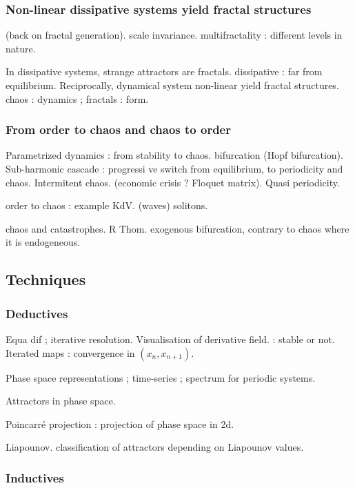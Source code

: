 \subsubsection{Non-linear dissipative systems yield fractal structures}

(back on fractal generation). scale invariance. multifractality : different levels in nature.

In dissipative systems, strange attractors are fractals. dissipative : far from equilibrium. Reciprocally, dynamical system non-linear yield fractal structures. chaos : dynamics ; fractals : form.

\subsubsection{From order to chaos and chaos to order}

Parametrized dynamics : from stability to chaos. bifurcation (Hopf bifurcation). Sub-harmonic cascade : progressi ve switch from equilibrium, to periodicity and chaos. Intermitent chaos. (economic crisis ? Floquet matrix). Quasi periodicity.

order to chaos : example KdV. (waves) solitons.

chaos and catastrophes. R Thom. exogenous bifurcation, contrary to chaos where it is endogeneous.

\subsection{Techniques}

\subsubsection{Deductives}

Equa dif ; iterative resolution. Visualisation of derivative field. : stable or not. Iterated maps : convergence in $(x_n,x_{n+1})$.

Phase space representations ; time-series ; spectrum for periodic systems.

Attractors in phase space.

Poincarré projection : projection of phase space in 2d.

Liapounov. classification of attractors depending on Liapounov values.

\subsubsection{Inductives}

